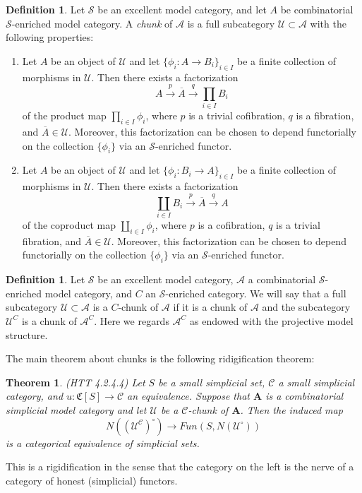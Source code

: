 \documentclass[letterpaper]{article}
\newtheorem{theorem}{Theorem}
\theoremstyle{definition}
\newtheorem{definition}[lemma]{Definition}
\newcommand{\mc}{\mathcal}
\begin{document}
\begin{definition}
Let $\mc S$ be an excellent model category, and let $A$ be combinatorial
$\mc S$-enriched model category. A \emph{chunk} of $\mc A$ is a full
subcategory  $ \mc U \subset \mc A$ with the following properties:
\begin{enumerate}
\item Let $A$ be an object of $\mc U$ and let $\{\phi_i : A
  \rightarrow B_i\}_{i \in I}$ be a finite collection of morphisms in
  $\mc U$. Then there exists a factorization
\[
A \xrightarrow{p} \overline A \xrightarrow{q} \prod_{i \in I} B_i
\]
of the product map $\prod_{i \in I} \phi_i$, where $p$ is a trivial
cofibration, $q$ is a fibration, and $\overline A \in \mc
U$. Moreover, this factorization can be chosen to depend functorially
on the collection $\{\phi_i\}$ via an $\mc S$-enriched functor.
\item Let $A$ be an object of $\mc U$ and let $\{\phi_i : B_i
  \rightarrow A\}_{i \in I}$ be a finite collection of morphisms in
  $\mc U$. Then there exists a factorization
\[
\coprod_{i \in I} B_i \xrightarrow{p} \overline A \xrightarrow{q} A
\]
of the coproduct map $\coprod_{i \in I} \phi_i$, where $p$ is a
cofibration, $q$ is a trivial fibration, and $\overline A \in \mc
U$. Moreover, this factorization can be chosen to depend functorially
on the collection $\{\phi_i\}$ via an $\mc S$-enriched functor. 
\end{enumerate}
\end{definition}

\begin{definition}
Let $\mc S$ be an excellent model category, $\mc A$ a combinatorial
$\mc S$-enriched model category, and $C$ an $\mc S$-enriched
category. We will say that a full subcategory $\mc U \subset \mc A$ is
a $C$-chunk of $\mc A$ if it is a chunk of $\mc A$ and the subcategory
$\mc U^C$ is a chunk of $\mc A^C$. Here we regards $\mc A^C$ as
endowed with the projective model structure. 
\end{definition}

The main theorem about chunks is the following ridigification theorem:

\begin{theorem}(HTT 4.2.4.4)
Let $S$ be a small simplicial set, $\mc C$ a small simplicial
category, and $u : \mathfrak C[S] \rightarrow \mc C$ an
equivalence. Suppose that $\mathbf{A}$ is a combinatorial simplicial
model category and let $\mc U$ be a $\mc C$-chunk of
$\mathbf{A}$. Then the induced map
\[
N((\mc U^{\mc C})^{\circ}) \rightarrow Fun(S,N(\mc U^{\circ}))
\]
is a categorical equivalence of simplicial sets. 
\end{theorem}

This is a rigidification in the sense that the category on the left is
the nerve of a category of honest (simplicial) functors.
\end{document}
